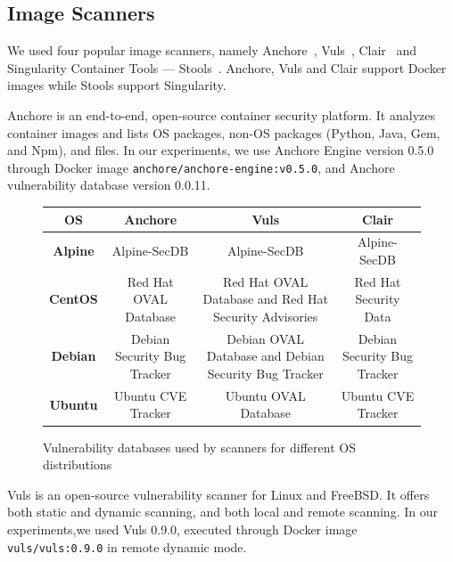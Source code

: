 \documentclass[a4paper,num-refs]{oup-contemporary}
\begin{document}
\subsection{Image Scanners}

We used four popular image scanners, namely Anchore~\cite{github_2019},
Vuls~\cite{future-architect_2019}, Clair~\cite{arminc_2019} and
Singularity Container Tools --- Stools~\cite{stools}. Anchore, Vuls and Clair support Docker
images while Stools support Singularity. 

Anchore is an end-to-end, open-source container security platform. It
analyzes container images and lists OS
packages, non-OS packages (Python, Java, Gem, and Npm), and files.
In our experiments, we use Anchore Engine version 0.5.0 through Docker image \texttt{anchore/anchore-engine:v0.5.0}, and
Anchore vulnerability database version 0.0.11.

\begin{figure}
\begin{tabular}{|c|c|c|c|}
 \hline
\textbf{OS} &	\textbf{Anchore} &	\textbf{Vuls} &	\textbf{Clair} \\
\hline
	\textbf{Alpine} & Alpine-SecDB &	Alpine-SecDB &	Alpine-SecDB \\
\hline
	\textbf{CentOS} & Red Hat OVAL Database & Red Hat OVAL Database and Red Hat Security Advisories & Red Hat Security Data \\
\hline
	\textbf{Debian} & Debian Security Bug Tracker &	Debian OVAL Database and Debian Security Bug Tracker & Debian Security Bug Tracker \\
\hline
	\textbf{Ubuntu} & Ubuntu CVE Tracker &	Ubuntu OVAL Database &	Ubuntu CVE Tracker \\
 \hline
\end{tabular}
\caption{Vulnerability databases used by scanners for different OS distributions}
\label{database}
\end{figure}

Vuls is an open-source vulnerability scanner for Linux and FreeBSD. It
offers both static and dynamic scanning, and both local and remote
scanning. In our experiments,we used Vuls 0.9.0, executed through Docker image
\texttt{vuls/vuls:0.9.0} in remote dynamic mode.
\end{document}
